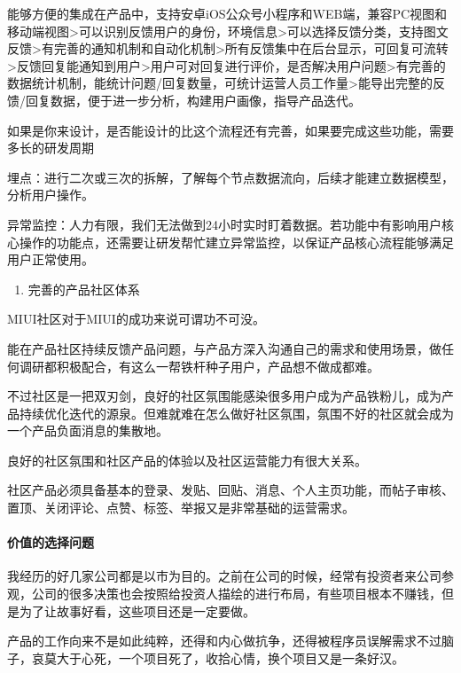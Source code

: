 \documentclass[letterpaper,10pt,english]{sphinxmanual}
\begin{document}
能够方便的集成在产品中，支持安卓iOS公众号小程序和WEB端，兼容PC视图和移动端视图\sphinxhyphen{}>可以识别反馈用户的身份，环境信息\sphinxhyphen{}>可以选择反馈分类，支持图文反馈\sphinxhyphen{}>有完善的通知机制和自动化机制\sphinxhyphen{}>所有反馈集中在后台显示，可回复可流转\sphinxhyphen{}>反馈回复能通知到用户\sphinxhyphen{}>用户可对回复进行评价，是否解决用户问题\sphinxhyphen{}>有完善的数据统计机制，能统计问题/回复数量，可统计运营人员工作量\sphinxhyphen{}>能导出完整的反馈/回复数据，便于进一步分析，构建用户画像，指导产品迭代。

如果是你来设计，是否能设计的比这个流程还有完善，如果要完成这些功能，需要多长的研发周期

埋点：进行二次或三次的拆解，了解每个节点数据流向，后续才能建立数据模型，分析用户操作。

异常监控：人力有限，我们无法做到24小时实时盯着数据。若功能中有影响用户核心操作的功能点，还需要让研发帮忙建立异常监控，以保证产品核心流程能够满足用户正常使用。
\begin{enumerate}
%
\item {} 
完善的产品社区体系

\end{enumerate}

MIUI社区对于MIUI的成功来说可谓功不可没。

能在产品社区持续反馈产品问题，与产品方深入沟通自己的需求和使用场景，做任何调研都积极配合，有这么一帮铁杆种子用户，产品想不做成都难。

不过社区是一把双刃剑，良好的社区氛围能感染很多用户成为产品铁粉儿，成为产品持续优化迭代的源泉。但难就难在怎么做好社区氛围，氛围不好的社区就会成为一个产品负面消息的集散地。

良好的社区氛围和社区产品的体验以及社区运营能力有很大关系。

社区产品必须具备基本的登录、发贴、回贴、消息、个人主页功能，而帖子审核、置顶、关闭评论、点赞、标签、举报又是非常基础的运营需求。


\paragraph{价值的选择问题}
\label{\detokenize{chapter_project/valuable:id5}}
我经历的好几家公司都是以市为目的。之前在公司的时候，经常有投资者来公司参观，公司的很多决策也会按照给投资人描绘的进行布局，有些项目根本不赚钱，但是为了让故事好看，这些项目还是一定要做。

产品的工作向来不是如此纯粹，还得和内心做抗争，还得被程序员误解需求不过脑子，哀莫大于心死，一个项目死了，收拾心情，换个项目又是一条好汉。
\end{document}
